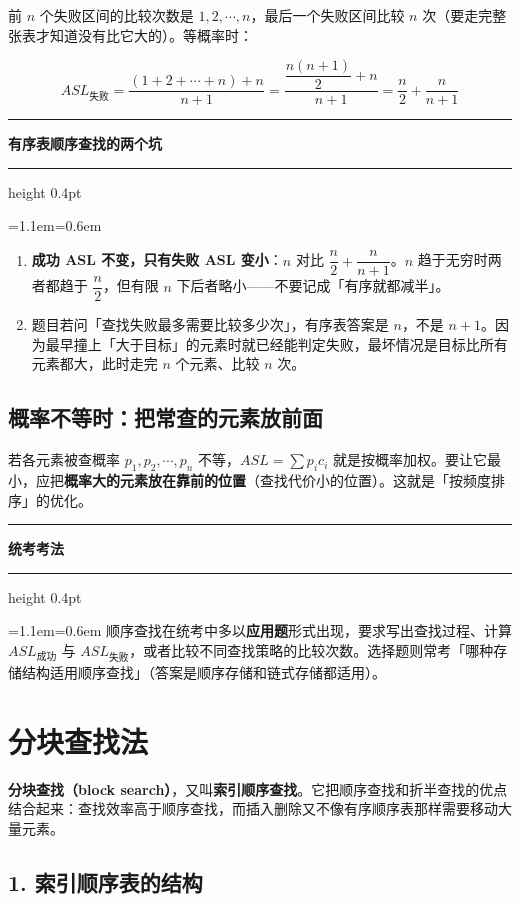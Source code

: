 \documentclass[11pt,openany,UTF8]{ctexbook}
\newcommand{\callouthead}[2]{%
  \par\addvspace{7pt}\noindent
  {\color{#1}\rule[-0.15em]{3pt}{1.05em}}\hspace{0.5em}%
  {\bfseries\color{#1}#2}\par\nobreak\vspace{-0.35em}%
  {\color{rulesep}\hrule height 0.4pt}\nobreak\vspace{0.45em}%
  \begingroup\small\setlength{\parindent}{0pt}%
  \leftskip=1.1em\rightskip=0.6em\noindent\ignorespaces}
\newcommand{\calloutend}{\par\endgroup\addvspace{7pt}}
\newenvironment{callwarn}[1]{\callouthead{warnbar}{#1}}{\calloutend}
\newenvironment{callexam}[1]{\callouthead{exambar}{#1}}{\calloutend}
\begin{document}
前 $n$ 个失败区间的比较次数是 $1,2,\cdots,n$，最后一个失败区间比较 $n$ 次（要走完整张表才知道没有比它大的）。等概率时：

\[ASL_{失败}=\frac{(1+2+\cdots+n)+n}{n+1}=\frac{\dfrac{n(n+1)}{2}+n}{n+1}=\frac{n}{2}+\frac{n}{n+1}\]

\begin{callwarn}{有序表顺序查找的两个坑}
\begin{enumerate}
\item \textbf{成功 ASL 不变，只有失败 ASL 变小}：$n$ 对比 $\dfrac{n}{2}+\dfrac{n}{n+1}$。$n$ 趋于无穷时两者都趋于 $\dfrac{n}{2}$，但有限 $n$ 下后者略小——不要记成「有序就都减半」。
\item 题目若问「查找失败最多需要比较多少次」，有序表答案是 $n$，不是 $n+1$。因为最早撞上「大于目标」的元素时就已经能判定失败，最坏情况是目标比所有元素都大，此时走完 $n$ 个元素、比较 $n$ 次。
\end{enumerate}
\end{callwarn}

\subsection{概率不等时：把常查的元素放前面}

若各元素被查概率 $p_1,p_2,\cdots,p_n$ 不等，$ASL=\sum p_ic_i$ 就是按概率加权。要让它最小，应把\textbf{概率大的元素放在靠前的位置}（查找代价小的位置）。这就是「按频度排序」的优化。

\begin{callexam}{统考考法}
顺序查找在统考中多以\textbf{应用题}形式出现，要求写出查找过程、计算 $ASL_{成功}$ 与 $ASL_{失败}$，或者比较不同查找策略的比较次数。选择题则常考「哪种存储结构适用顺序查找」（答案是顺序存储和链式存储都适用）。

\end{callexam}

\section{分块查找法}

\textbf{分块查找（block search）}，又叫\textbf{索引顺序查找}。它把顺序查找和折半查找的优点结合起来：查找效率高于顺序查找，而插入删除又不像有序顺序表那样需要移动大量元素。

\subsection*{1. 索引顺序表的结构}
\end{document}

